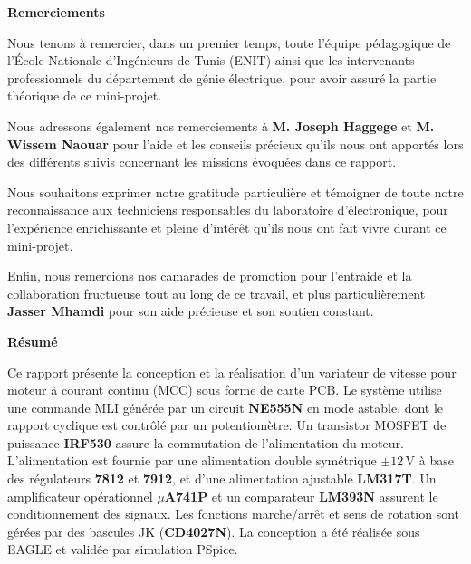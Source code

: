 \documentclass[a4paper,12pt,openany]{book}
\begin{document}
	\newpage
	\thispagestyle{empty}
	\centerline{\Large \textbf{Remerciements}}
	\vspace{2\baselineskip}
	
	Nous tenons \`a remercier, dans un premier temps, toute l'\'equipe
	p\'edagogique de l'\'Ecole Nationale d'Ing\'enieurs de Tunis (ENIT) ainsi
	que les intervenants professionnels du d\'epartement de g\'enie
	\'electrique, pour avoir assur\'e la partie th\'eorique de ce mini-projet.
	
	Nous adressons \'egalement nos remerciements \`a \textbf{M. Joseph Haggege}
	et \textbf{M. Wissem Naouar} pour l'aide et les conseils pr\'ecieux qu'ils
	nous ont apport\'es lors des diff\'erents suivis concernant les missions
	\'evoqu\'ees dans ce rapport.
	
	Nous souhaitons exprimer notre gratitude particuli\`ere et t\'emoigner de
	toute notre reconnaissance aux techniciens responsables du laboratoire
	d'\'electronique, pour l'exp\'erience enrichissante et pleine d'int\'er\^et
	qu'ils nous ont fait vivre durant ce mini-projet.
	
	Enfin, nous remercions nos camarades de promotion pour l'entraide et la
	collaboration fructueuse tout au long de ce travail, et plus
	particuli\`erement \textbf{Jasser Mhamdi} pour son aide pr\'ecieuse et
	son soutien constant.
	
	\newpage
	\thispagestyle{empty}
	\centerline{\Large \textbf{R\'esum\'e}}
	\vspace{\baselineskip}
	
	Ce rapport pr\'esente la conception et la r\'ealisation d'un variateur de
	vitesse pour moteur \`a courant continu (MCC) sous forme de carte PCB.
	Le syst\`eme utilise une commande MLI g\'en\'er\'ee par un circuit
	\textbf{NE555N} en mode astable, dont le rapport cyclique est contr\^ol\'e
	par un potentiom\`etre. Un transistor MOSFET de puissance \textbf{IRF530}
	assure la commutation de l'alimentation du moteur. L'alimentation est
	fournie par une alimentation double sym\'etrique $\pm12$\,V \`a base des
	r\'egulateurs \textbf{7812} et \textbf{7912}, et d'une alimentation
	ajustable \textbf{LM317T}. Un amplificateur op\'erationnel \textbf{$\mu$A741P}
	et un comparateur \textbf{LM393N} assurent le conditionnement des signaux.
	Les fonctions marche/arr\^et et sens de rotation sont g\'er\'ees par des
	bascules JK (\textbf{CD4027N}). La conception a \'et\'e r\'ealis\'ee sous
	EAGLE et valid\'ee par simulation PSpice.
	
\end{document}
